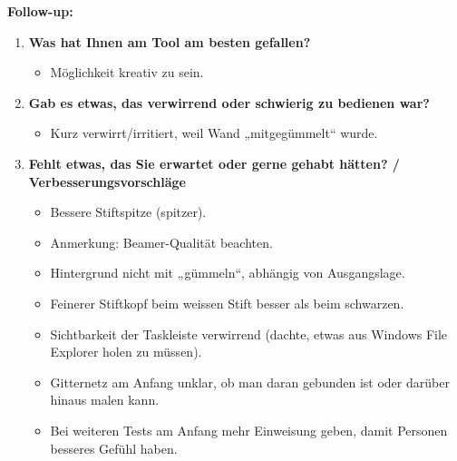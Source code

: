 \textbf{Follow-up:}  
\begin{enumerate}
    \item \textbf{Was hat Ihnen am Tool am besten gefallen?}
    \begin{itemize}
        \item Möglichkeit kreativ zu sein.
    \end{itemize}

    \item \textbf{Gab es etwas, das verwirrend oder schwierig zu bedienen war?}
    \begin{itemize}
        \item Kurz verwirrt/irritiert, weil Wand „mitgegümmelt“ wurde.
    \end{itemize}

    \item \textbf{Fehlt etwas, das Sie erwartet oder gerne gehabt hätten? / Verbesserungsvorschläge}
    \begin{itemize}
        \item Bessere Stiftspitze (spitzer).  
        \item Anmerkung: Beamer-Qualität beachten.  
        \item Hintergrund nicht mit „gümmeln“, abhängig von Ausgangslage.  
        \item Feinerer Stiftkopf beim weissen Stift besser als beim schwarzen.  
        \item Sichtbarkeit der Taskleiste verwirrend (dachte, etwas aus Windows File Explorer holen zu müssen).  
        \item Gitternetz am Anfang unklar, ob man daran gebunden ist oder darüber hinaus malen kann.  
        \item Bei weiteren Tests am Anfang mehr Einweisung geben, damit Personen besseres Gefühl haben.
    \end{itemize}
\end{enumerate}

\clearpage
